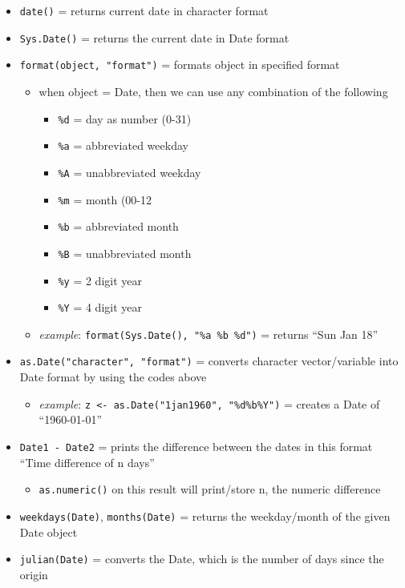 \documentclass[
]{article}
\providecommand{\tightlist}{%
  \setlength{\itemsep}{0pt}\setlength{\parskip}{0pt}}
\begin{document}
\begin{itemize}
\tightlist
\item
  \texttt{date()} = returns current date in character format
\item
  \texttt{Sys.Date()} = returns the current date in Date format
\item
  \texttt{format(object,\ "format")} = formats object in specified
  format

  \begin{itemize}
  \tightlist
  \item
    when object = Date, then we can use any combination of the following

    \begin{itemize}
    \tightlist
    \item
      \texttt{\%d} = day as number (0-31)
    \item
      \texttt{\%a} = abbreviated weekday
    \item
      \texttt{\%A} = unabbreviated weekday
    \item
      \texttt{\%m} = month (00-12
    \item
      \texttt{\%b} = abbreviated month
    \item
      \texttt{\%B} = unabbreviated month
    \item
      \texttt{\%y} = 2 digit year
    \item
      \texttt{\%Y} = 4 digit year
    \end{itemize}
  \item
    \emph{example}: \texttt{format(Sys.Date(),\ "\%a\ \%b\ \%d")} =
    returns ``Sun Jan 18''
  \end{itemize}
\item
  \texttt{as.Date("character",\ "format")} = converts character
  vector/variable into Date format by using the codes above

  \begin{itemize}
  \tightlist
  \item
    \emph{example}:
    \texttt{z\ \textless{}-\ as.Date("1jan1960",\ "\%d\%b\%Y")} =
    creates a Date of ``1960-01-01''
  \end{itemize}
\item
  \texttt{Date1\ -\ Date2} = prints the difference between the dates in
  this format ``Time difference of n days''

  \begin{itemize}
  \tightlist
  \item
    \texttt{as.numeric()} on this result will print/store n, the numeric
    difference
  \end{itemize}
\item
  \texttt{weekdays(Date)}, \texttt{months(Date)} = returns the
  weekday/month of the given Date object
\item
  \texttt{julian(Date)} = converts the Date, which is the number of days
  since the origin


\end{itemize}
\end{document}
